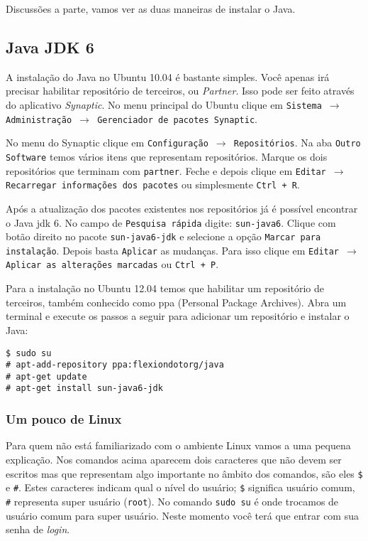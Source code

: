Discussões a parte, vamos ver as duas maneiras de instalar o Java.

\subsection{Java JDK 6}

A instalação do Java no Ubuntu 10.04 é bastante simples. Você apenas irá precisar habilitar repositório
de terceiros, ou \textit{Partner}. Isso pode ser feito através do aplicativo \textit{Synaptic}. No menu
principal do Ubuntu clique em \texttt{Sistema $\rightarrow$ Administração $\rightarrow$ Gerenciador de pacotes
Synaptic}.

No menu do Synaptic clique em \texttt{Configuração $\rightarrow$ Repositórios}. Na aba \texttt{Outro Software}
temos vários itens que representam repositórios. Marque os dois repositórios que terminam com \texttt{partner}.
Feche e depois clique em \texttt{Editar $\rightarrow$ Recarregar informações dos pacotes} ou simplesmente
\texttt{Ctrl + R}.

Após a atualização dos pacotes existentes nos repositórios já é possível encontrar o Java \gls{jdk} 6.
No campo de \texttt{Pesquisa rápida} digite: \texttt{sun-java6}. Clique com botão direito no pacote
\texttt{sun-java6-jdk} e selecione a opção \texttt{Marcar para instalação}. Depois basta \texttt{Aplicar}
as mudanças. Para isso clique em \texttt{Editar $\rightarrow$ Aplicar as alterações marcadas} ou \texttt{Ctrl + P}.

\bigskip

Para a instalação no Ubuntu 12.04 temos que habilitar um repositório de terceiros, também conhecido como
\gls{ppa} (Personal Package Archives). Abra um terminal e execute os passos a seguir para adicionar um
repositório e instalar o Java:

\begin{flushleft}\texttt{\$ sudo su\\
\# apt-add-repository ppa:flexiondotorg/java\\
\# apt-get update\\
\# apt-get install sun-java6-jdk\\}
\end{flushleft}

\subsubsection{Um pouco de Linux}

Para quem não está familiarizado com o ambiente Linux vamos a uma pequena explicação. Nos comandos
acima aparecem dois caracteres que não devem ser escritos mas que representam algo importante no âmbito
dos comandos, são eles \texttt{\$} e \texttt{\#}. Estes caracteres indicam qual o nível do usuário;
\texttt{\$} significa usuário comum, \texttt{\#} representa super usuário (\texttt{root}). No comando
\texttt{sudo su} é onde trocamos de usuário comum para super usuário. Neste momento você terá que entrar
com sua senha de \textit{login}.

